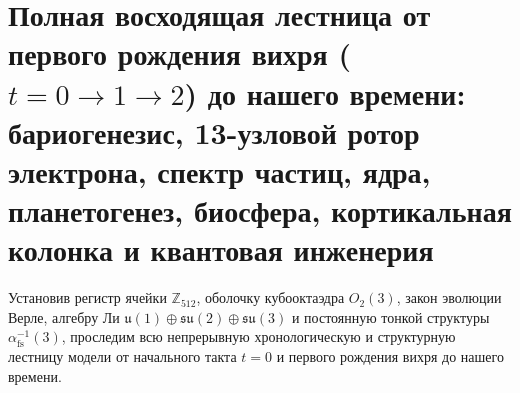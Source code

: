 \documentclass[11pt,a4paper]{article}
\theoremstyle{plain}
\theoremstyle{definition}
\begin{document}
\section{Полная восходящая лестница от первого рождения вихря (\texorpdfstring{$t = 0 \to 1 \to 2$}{t = 0 -> 1 -> 2}) до нашего времени: бариогенезис, 13-узловой ротор электрона, спектр частиц, ядра, планетогенез, биосфера, кортикальная колонка и квантовая инженерия}
\label{sec:complete-bottom-up-ladder}

Установив регистр ячейки $\mathbb{Z}_{512}$, оболочку кубооктаэдра $O_2(3)$, закон эволюции Верле, алгебру Ли $\mathfrak{u}(1)\oplus\mathfrak{su}(2)\oplus\mathfrak{su}(3)$ и постоянную тонкой структуры $\alpha_{\mathrm{fs}}^{-1}(3)$, проследим всю непрерывную хронологическую и структурную лестницу модели от начального такта $t = 0$ и первого рождения вихря до нашего времени.
\end{document}
